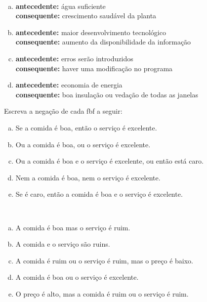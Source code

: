 \documentclass[a4paper, 12pt, addpoints]{exam}
\begin{document}
\begin{questions}
  \begin{resp}~
        \begin{enumerate}[a)]
          \item \textbf{antecedente:} água suficiente \\ \textbf{consequente:} crescimento saudável da planta
          \item \textbf{antecedente:} maior desenvolvimento tecnológico \\ \textbf{consequente:} aumento da disponibilidade da informação
          \item \textbf{antecedente:} erros serão introduzidos \\ \textbf{consequente:} haver uma modificação no programa
          \item \textbf{antecedente:} economia de energia \\ \textbf{consequente:} boa insulação ou vedação de todas as janelas
        \end{enumerate}
  \end{resp}

  \question Escreva a negação de cada fbf a seguir:
  \begin{enumerate}[a)]
    \item Se a comida é boa, então o serviço é excelente.
    \item Ou a comida é boa, ou o serviço é excelente.
    \item Ou a comida é boa e o serviço é excelente, ou então está caro.
    \item Nem a comida é boa, nem o serviço é excelente.
    \item Se é caro, então a comida é boa e o serviço é excelente.
  \end{enumerate}

  \begin{resp}~
        \begin{enumerate}[a)]
          \item A comida é boa mas o serviço é ruim.
          \item A comida e o serviço são ruins.
          \item A comida é ruim ou o serviço é ruim, mas o preço é baixo.
          \item A comida é boa ou o serviço é excelente.
          \item O preço é alto, mas a comida é ruim ou o serviço é ruim.
        \end{enumerate}
  \end{resp}


\end{questions}
\end{document}

